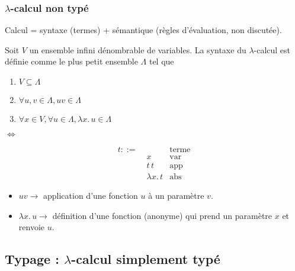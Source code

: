 \documentclass{beamer}
\newcommand{\lambdaExpr}[2]{\lambda #1 . \, #2}
\begin{document}
\begin{frame}
  \frametitle{$\lambda$-calcul non typé}
  Calcul = syntaxe (termes) + sémantique (règles d'évaluation, non discutée).

  Soit $V$ un ensemble infini dénombrable de variables. La syntaxe du
  $\lambda$-calcul est définie comme le plus petit ensemble $\Lambda$ tel que

  \begin{minipage}{0.45\textwidth}
    \begin{enumerate}
    \item $V \subseteq \Lambda$
    \item $\forall u, v \in \Lambda, uv \in \Lambda$
    \item $\forall x \in V, \forall u \in \Lambda, \lambdaExpr{x}{u} \in \Lambda$
    \end{enumerate}
  \end{minipage}
  \begin{minipage}{0.05\textwidth}
    $\Leftrightarrow$
  \end{minipage}
  \begin{minipage}{0.45\textwidth}
    \begin{align*}
      t ::= & \, & \text{terme} \\
        & \; x & \text{var} \\
        & \; t \, t & \text{app} \\
        & \; \lambdaExpr{x}{t} & \text{abs}
    \end{align*}
  \end{minipage}
  \begin{itemize}
  \item $uv \rightarrow$ application d'une fonction $u$ à un paramètre $v$.
  \item $\lambdaExpr{x}{u} \rightarrow$ définition d'une fonction (anonyme) qui
    prend un paramètre $x$ et renvoie $u$. 
  \end{itemize}
\end{frame}


\subsection*{Typage : $\lambda$-calcul simplement typé}
\end{document}
